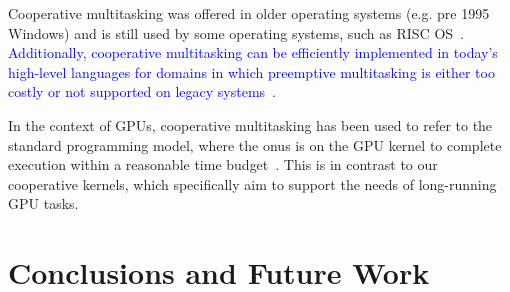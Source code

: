 \documentclass[sigconf]{acmart}
\newcommand{\TSAdded}[1]{\textcolor{blue}{#1}}
\begin{document}
{%
%


%
Cooperative multitasking was offered in older operating systems
(e.g. pre 1995 Windows) and is still used by some operating systems,
such as RISC OS~\cite{risc-os-multitasking}. \TSAdded{Additionally,
  cooperative multitasking can be efficiently implemented in today's
  high-level languages for domains in which preemptive multitasking is
  either too costly or not supported on legacy
  systems~\cite{Tarpenning:1991:CMC:136810.136820}}.


In the context of GPUs, cooperative multitasking has been used to
refer to the standard programming model, where the onus is on the GPU kernel
to complete execution within a reasonable time budget~\cite{adriaens2012case,CPE:CPE1722}.
%
This is in contrast to our cooperative kernels, which specifically aim to support the needs of long-running GPU tasks.


\section{Conclusions and Future Work}\label{sec:conclusion}

}
\end{document}
